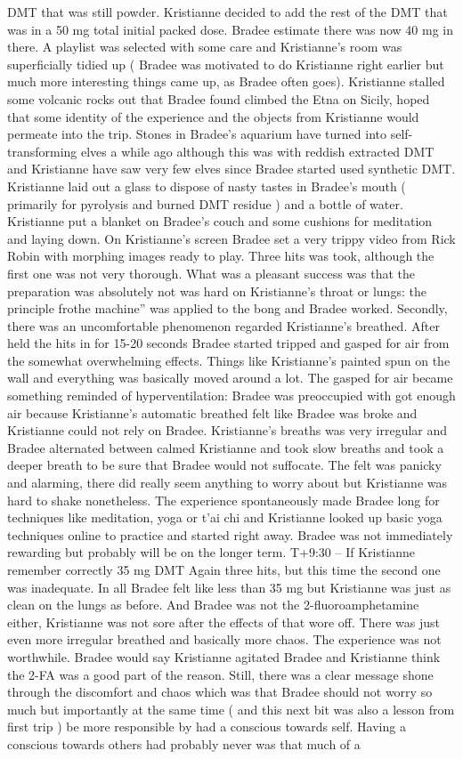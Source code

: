 \documentclass[12pt]{book}
\begin{document}
DMT that was still powder. Kristianne decided to add the rest of the DMT that was in a 50 mg total initial packed dose. Bradee estimate there was now 40 mg in there. A playlist was selected with some care and Kristianne's room was superficially tidied up ( Bradee was motivated to do Kristianne right earlier but much more interesting things came up, as Bradee often goes). Kristianne stalled some volcanic rocks out that Bradee found climbed the Etna on Sicily, hoped that some identity of the experience and the objects from Kristianne would permeate into the trip. Stones in Bradee's aquarium have turned into self-transforming elves a while ago although this was with reddish extracted DMT and Kristianne have saw very few elves since Bradee started used synthetic DMT. Kristianne laid out a glass to dispose of nasty tastes in Bradee's mouth ( primarily for pyrolysis and burned DMT residue ) and a bottle of water. Kristianne put a blanket on Bradee's couch and some cushions for meditation and laying down. On Kristianne's screen Bradee set a very trippy video from Rick Robin with morphing images ready to play. Three hits was took, although the first one was not very thorough. What was a pleasant success was that the preparation was absolutely not was hard on Kristianne's throat or lungs: the principle frothe machine'' was applied to the bong and Bradee worked. Secondly, there was an uncomfortable phenomenon regarded Kristianne's breathed. After held the hits in for 15-20 seconds Bradee started tripped and gasped for air from the somewhat overwhelming effects. Things like Kristianne's painted spun on the wall and everything was basically moved around a lot. The gasped for air became something reminded of hyperventilation: Bradee was preoccupied with got enough air because Kristianne's automatic breathed felt like Bradee was broke and Kristianne could not rely on Bradee. Kristianne's breaths was very irregular and Bradee alternated between calmed Kristianne and took slow breaths and took a deeper breath to be sure that Bradee would not suffocate. The felt was panicky and alarming, there did really seem anything to worry about but Kristianne was hard to shake nonetheless. The experience spontaneously made Bradee long for techniques like meditation, yoga or t'ai chi and Kristianne looked up basic yoga techniques online to practice and started right away. Bradee was not immediately rewarding but probably will be on the longer term. T+9:30 -- If Kristianne remember correctly 35 mg DMT Again three hits, but this time the second one was inadequate. In all Bradee felt like less than 35 mg but Kristianne was just as clean on the lungs as before. And Bradee was not the 2-fluoroamphetamine either, Kristianne was not sore after the effects of that wore off. There was just even more irregular breathed and basically more chaos. The experience was not worthwhile. Bradee would say Kristianne agitated Bradee and Kristianne think the 2-FA was a good part of the reason. Still, there was a clear message shone through the discomfort and chaos which was that Bradee should not worry so much but importantly at the same time ( and this next bit was also a lesson from first trip ) be more responsible by had a conscious towards self. Having a conscious towards others had probably never was that much of a 
\end{document}
